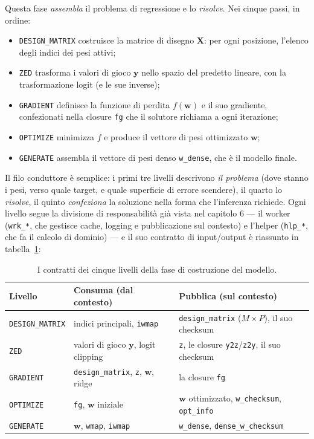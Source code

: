 Questa fase \emph{assembla} il problema di regressione e lo \emph{risolve}.
Nei cinque passi, in ordine:
\begin{itemize}
  \item \texttt{DESIGN\_MATRIX} costruisce la matrice di disegno $\bm{X}$: per
    ogni posizione, l'elenco degli indici dei pesi attivi;
  \item \texttt{ZED} trasforma i valori di gioco $\bm{y}$ nello spazio del
    predetto lineare, con la trasformazione logit (e le sue inverse);
  \item \texttt{GRADIENT} definisce la funzione di perdita $f(\bm{w})$ e il
    suo gradiente, confezionati nella closure \texttt{fg} che il solutore
    richiama a ogni iterazione;
  \item \texttt{OPTIMIZE} minimizza $f$ e produce il vettore di pesi
    ottimizzato $\bm{w}$;
  \item \texttt{GENERATE} assembla il vettore di pesi denso \texttt{w\_dense},
    che è il modello finale.
\end{itemize}
Il filo conduttore è semplice: i primi tre livelli descrivono \emph{il
problema} (dove stanno i pesi, verso quale target, e quale superficie di
errore scendere), il quarto lo \emph{risolve}, il quinto \emph{confeziona} la
soluzione nella forma che l'inferenza richiede. Ogni livello segue la divisione
di responsabilità già vista nel capitolo 6 — il worker
(\texttt{wrk\_*}, che gestisce cache, logging e pubblicazione sul contesto) e
l'helper (\texttt{hlp\_*}, che fa il calcolo di dominio) — e il suo contratto
di input/output è riassunto in tabella~\ref{tab:costruzione-contracti}:

\begin{table}[htbp]
\centering
\small
\begin{tabular}{lll}
\toprule
Livello & Consuma (dal contesto) & Pubblica (sul contesto) \\
\midrule
\texttt{DESIGN\_MATRIX} & indici principali, \texttt{iwmap} & \texttt{design\_matrix} ($M \times P$), il suo checksum \\
\texttt{ZED}           & valori di gioco $\bm{y}$, logit clipping & \texttt{z}, le closure \texttt{y2z}/\texttt{z2y}, il suo checksum \\
\texttt{GRADIENT}      & \texttt{design\_matrix}, \texttt{z}, $\bm{w}$, ridge & la closure \texttt{fg} \\
\texttt{OPTIMIZE}      & \texttt{fg}, $\bm{w}$ iniziale & $\bm{w}$ ottimizzato, \texttt{w\_checksum}, \texttt{opt\_info} \\
\texttt{GENERATE}      & $\bm{w}$, \texttt{wmap}, \texttt{iwmap} & \texttt{w\_dense}, \texttt{dense\_w\_checksum} \\
\bottomrule
\end{tabular}
\caption{I contratti dei cinque livelli della fase di costruzione del modello.}
\label{tab:costruzione-contracti}
\end{table}

